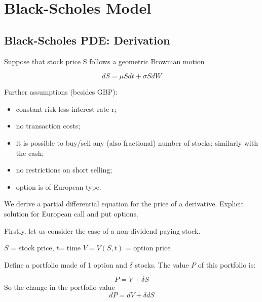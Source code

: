 \chapter{Black-Scholes Model}

\section{Black-Scholes PDE: Derivation}
Suppose that stock price S follows a geometric Brownian motion

\begin{equation}
dS = \mu Sdt + \sigma SdW
\end{equation}

Further assumptions (besides GBP):
\begin{itemize}
\tightlist 
\item constant risk-less interest rate r;
\item no transaction costs;
\item it is possible to buy/sell any (also fractional) number of stocks; similarly with the cash;
\item no restrictions on short selling;
\item option is of European type.
\end{itemize}

We derive a partial differential equation for the price of a derivative.
Explicit solution for European call and put options.

Firstly, let us consider the case of a non-dividend paying stock.

$S$ = stock price,
$t$= time
$V=V(S, t)$ = option price

Define a portfolio made of 1 option and $\delta$ stocks. The value $P$ of this portfolio is:

\begin{equation}
P = V + \delta S
\end{equation}
So the change in the portfolio value
\begin{equation}
 dP = dV + \delta dS
\end{equation}

